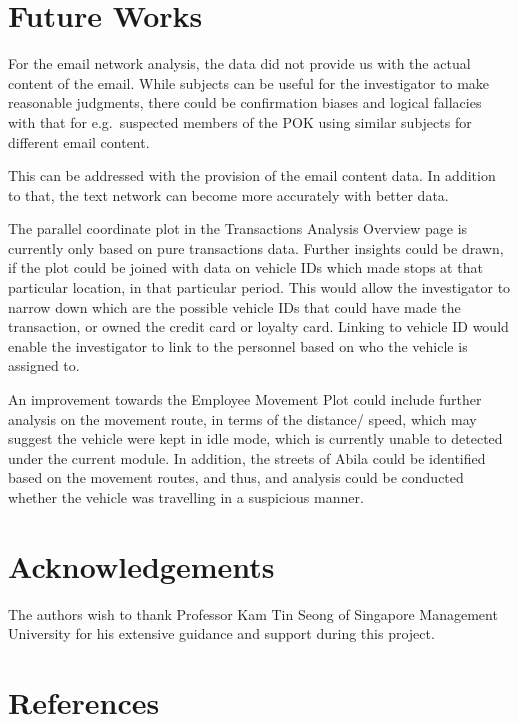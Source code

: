 \documentclass{acm_proc_article-sp}
\begin{document}
\hypertarget{future-works}{%
\section{Future Works}\label{future-works}}

For the email network analysis, the data did not provide us with the
actual content of the email. While subjects can be useful for the
investigator to make reasonable judgments, there could be confirmation
biases and logical fallacies with that for e.g.~suspected members of the
POK using similar subjects for different email content.

This can be addressed with the provision of the email content data. In
addition to that, the text network can become more accurately with
better data.

The parallel coordinate plot in the Transactions Analysis Overview page
is currently only based on pure transactions data. Further insights
could be drawn, if the plot could be joined with data on vehicle IDs
which made stops at that particular location, in that particular period.
This would allow the investigator to narrow down which are the possible
vehicle IDs that could have made the transaction, or owned the credit
card or loyalty card. Linking to vehicle ID would enable the
investigator to link to the personnel based on who the vehicle is
assigned to.

An improvement towards the Employee Movement Plot could include further
analysis on the movement route, in terms of the distance/ speed, which
may suggest the vehicle were kept in idle mode, which is currently
unable to detected under the current module. In addition, the streets of
Abila could be identified based on the movement routes, and thus, and
analysis could be conducted whether the vehicle was travelling in a
suspicious manner.

\hypertarget{acknowledgements}{%
\section{Acknowledgements}\label{acknowledgements}}

The authors wish to thank Professor Kam Tin Seong of Singapore
Management University for his extensive guidance and support during this
project.

\hypertarget{references}{%
\section*{References}\label{references}}
\end{document}
